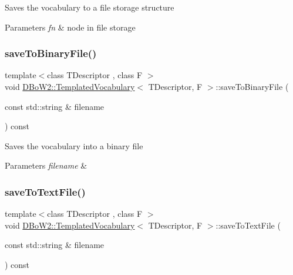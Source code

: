 Saves the vocabulary to a file storage structure 
\begin{DoxyParams}{Parameters}
{\em fn} & node in file storage \\
\hline
\end{DoxyParams}
\mbox{\label{class_d_bo_w2_1_1_templated_vocabulary_a256d9aaeb91b2ca9e626e3bc76359579}} 
\subsubsection{\texorpdfstring{save\+To\+Binary\+File()}{saveToBinaryFile()}}
{\footnotesize\ttfamily template$<$class T\+Descriptor , class F $>$ \\
void \mbox{\hyperlink{class_d_bo_w2_1_1_templated_vocabulary}{D\+Bo\+W2\+::\+Templated\+Vocabulary}}$<$ T\+Descriptor, F $>$\+::save\+To\+Binary\+File (\begin{DoxyParamCaption}\item[{const std\+::string \&}]{filename }\end{DoxyParamCaption}) const}

Saves the vocabulary into a binary file 
\begin{DoxyParams}{Parameters}
{\em filename} & \\
\hline
\end{DoxyParams}
\mbox{\label{class_d_bo_w2_1_1_templated_vocabulary_a1338b014b856d0a17e71010f6488548e}} 
\subsubsection{\texorpdfstring{save\+To\+Text\+File()}{saveToTextFile()}}
{\footnotesize\ttfamily template$<$class T\+Descriptor , class F $>$ \\
void \mbox{\hyperlink{class_d_bo_w2_1_1_templated_vocabulary}{D\+Bo\+W2\+::\+Templated\+Vocabulary}}$<$ T\+Descriptor, F $>$\+::save\+To\+Text\+File (\begin{DoxyParamCaption}\item[{const std\+::string \&}]{filename }\end{DoxyParamCaption}) const}

